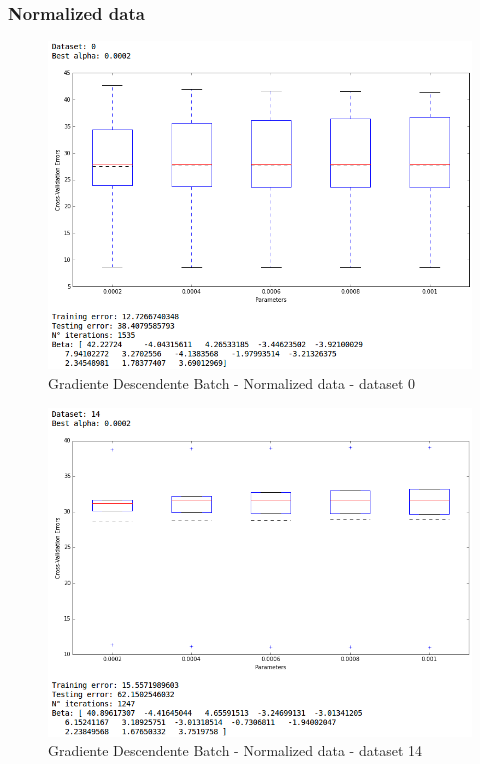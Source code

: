 \documentclass[spanish, fleqn]{article}
\begin{document}
\begin{enumerate}
\subsubsection*{Normalized data}
\begin{figure}[!htpb]
\centering
 \includegraphics[scale=0.45]{gd_batch_norm0.png}
 \caption{Gradiente Descendente Batch - Normalized data - dataset 0}
\end{figure}

\begin{figure}[!htpb]
\centering
 \includegraphics[scale=0.45]{gd_batch_norm14.png}
 \caption{Gradiente Descendente Batch - Normalized data - dataset 14}
\end{figure}


\end{enumerate}
\end{document}
